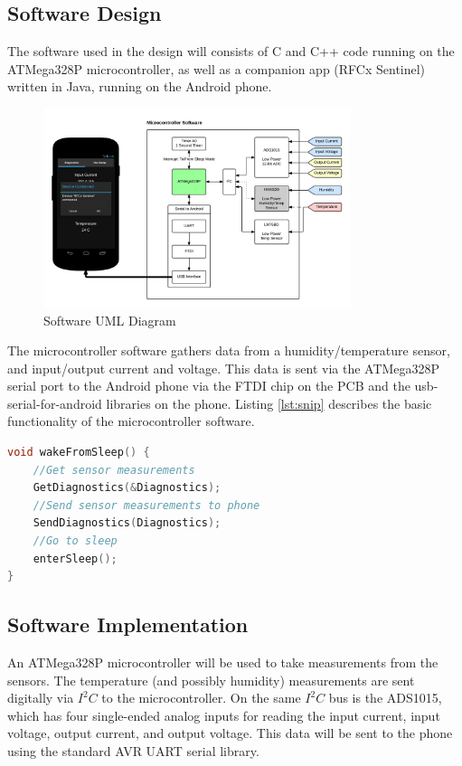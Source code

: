\documentclass{article}
\numberwithin{figure}{section}
\numberwithin{equation}{section}
\begin{document}
{\newpage
\subsection{Software Design} \label{sect:softwaredes}
The software used in the design will consists of C and C++ code running on the ATMega328P microcontroller, as well as a companion app (RFCx Sentinel) written in Java, running on the Android phone.
\begin{figure}[H]
	\centering
	\includegraphics[width=0.8\textwidth]{SoftwareUMLV2}
	\caption{Software UML Diagram}
	\label{fig:swuml}
\end{figure}

The microcontroller software gathers data from a humidity/temperature sensor, and input/output current and voltage. This data is sent via the ATMega328P serial port to the Android phone via the FTDI chip on the PCB and the usb-serial-for-android libraries on the phone.
Listing \ref{lst:snip} describes the basic functionality of the microcontroller software.

\begin{lstlisting}[language=C,label=lst:snip,caption=MCU Flow Code Snippet]
void wakeFromSleep() {
    //Get sensor measurements
    GetDiagnostics(&Diagnostics);
    //Send sensor measurements to phone
    SendDiagnostics(Diagnostics);
    //Go to sleep
    enterSleep();
}
\end{lstlisting}

\subsection{Software Implementation} \label{sect:softwareimp}

An ATMega328P microcontroller will be used to take measurements from the sensors. The temperature (and possibly humidity) measurements are sent digitally via $I^2 C$ to the microcontroller. On the same $I^2 C$ bus is the ADS1015, which has four single-ended analog inputs for reading the input current, input voltage, output current, and output voltage. This data will be sent to the phone using the standard AVR UART serial library.

}
\end{document}
